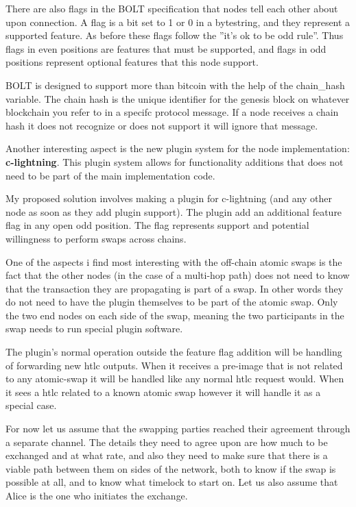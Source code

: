 There are also flags in the BOLT specification that nodes tell each other about
upon connection. A flag is a bit set to 1 or 0 in a bytestring, and they 
represent a supported feature. As before these
flags follow the ''it's ok to be odd rule''. Thus flags in even positions are 
features that must be supported, and flags in odd positions represent optional
features that this node support.

BOLT is designed to support more than bitcoin with the help of the chain\_hash 
variable. The chain hash is the unique identifier for the genesis block on
whatever blockchain you refer to in a specifc protocol message. If a node
receives a chain hash it does not recognize or does not support it will ignore
that message.

Another interesting aspect is the new plugin system for the node implementation: 
\textbf{c-lightning}. This plugin system allows for functionality additions that
does not need to be part of the main implementation code. 

My proposed solution involves making a plugin for c-lightning (and any other 
node as soon as they add plugin support). The plugin add an additional 
feature flag in any open odd position. The flag represents support and potential
willingness to perform swaps across chains. 

One of the aspects i find most interesting with the off-chain atomic swaps is
the fact that the other nodes (in the case of a multi-hop path) does not need
to know that the transaction they are propagating is part of a swap. In other 
words they do not need to have the plugin themselves to be part of the atomic
swap. Only the two end nodes on each side of the swap, meaning the two 
participants in the swap needs to run special plugin software. 

The plugin's normal operation outside the feature flag addition will be handling 
of forwarding new htlc outputs. When it receives a pre-image that is not related 
to any atomic-swap it will be handled like any normal htlc request would. 
When it sees a htlc related to a known atomic swap however it will handle it as 
a special case.

For now let us assume that the swapping parties reached their agreement through 
a separate channel. The details they need to agree upon are how much to be 
exchanged and at what rate, and also they need to make sure that there is a 
viable path between them on sides of the network, both to know if the swap 
is possible at all, and to know what timelock to start on. Let us also 
assume that Alice is the one who initiates the exchange.

